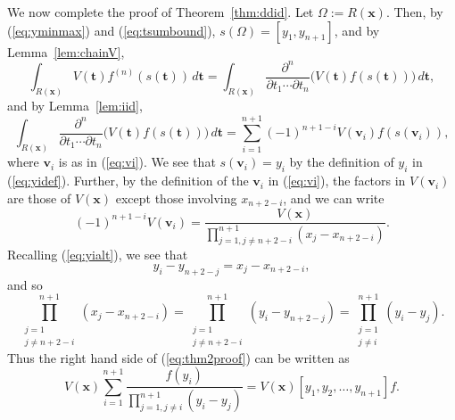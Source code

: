 \documentclass[12pt]{article}
\def\bft{\mathbf{t}}
\def\bfx{\mathbf{x}}
\def\bfv{\mathbf{v}}
\begin{document}
We now complete the proof of Theorem~\ref{thm:ddid}.
Let $\Omega := R(\bfx)$.
Then, by (\ref{eq:yminmax}) and (\ref{eq:tsumbound}),
$s(\Omega) = [y_1,y_{n+1}]$,
and by Lemma~\ref{lem:chainV},
$$
 \int_{R(\bfx)}
V(\bft) f^{(n)}(s(\bft)) \, d\bft = 
 \int_{R(\bfx)}
\frac{\partial^n}{\partial t_1 \cdots \partial t_n}
\big(V(\bft) f(s(\bft))\big) \, d\bft,
$$
and by Lemma~\ref{lem:iid},
\begin{equation}\label{eq:thm2proof}
 \int_{R(\bfx)}
\frac{\partial^n}{\partial t_1 \cdots \partial t_n}
\big(V(\bft) f(s(\bft))\big) \, d\bft =
\sum_{i=1}^{n+1} (-1)^{n+1-i} V(\bfv_i)f(s(\bfv_i)),
\end{equation}
where $\bfv_i$ is as in (\ref{eq:vi}).
We see that $s(\bfv_i) = y_i$ by the
definition of $y_i$ in (\ref{eq:yidef}).
Further, by the definition of the $\bfv_i$ in (\ref{eq:vi}),
the factors in $V(\bfv_i)$ are those of
$V(\bfx)$ except those involving $x_{n+2-i}$,
and we can write
$$ (-1)^{n+1-i} V(\bfv_i) =
\frac{V(\bfx)}{\prod_{j=1, j \ne n+2-i}^{n+1}
(x_j-x_{n+2-i})}. $$
Recalling (\ref{eq:yialt}), we see that
$$ y_i - y_{n+2-j} = x_j - x_{n+2-i}, $$
and so
$$ \prod_{\substack{j=1 \\ j \ne n+2-i}}^{n+1} (x_j-x_{n+2-i})
= \prod_{\substack{j=1 \\ j \ne n+2-i}}^{n+1} (y_i-y_{n+2-j})
= \prod_{\substack{j=1 \\ j \ne i}}^{n+1} (y_i-y_j). $$
Thus the right hand side of (\ref{eq:thm2proof}) can be written as
$$ V(\bfx) \sum_{i=1}^{n+1} 
  \frac{f(y_i)}{\prod_{j=1, j \ne i}^{n+1}
(y_i-y_j)}
= V(\bfx) [y_1,y_2,\ldots,y_{n+1}]f. $$


\end{document}
